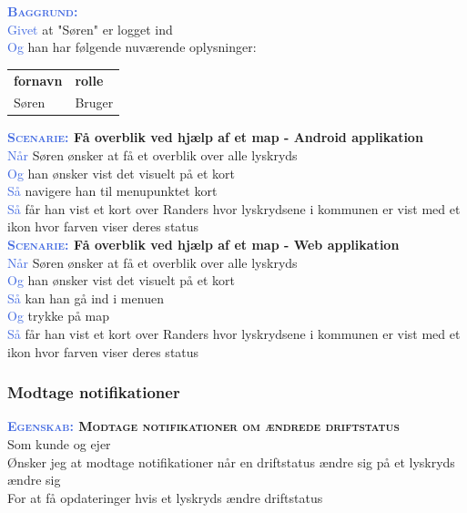 \textsc{\textcolor{RoyalBlue}{\textbf{Baggrund:}}}\\
\textcolor{RoyalBlue}{Givet} at "Søren" er logget ind\\
\textcolor{RoyalBlue}{Og} han har følgende nuværende oplysninger:\\
\begin{tabular}{| l | l |}
	\textbf{fornavn} & \textbf{rolle} \\
	Søren & Bruger\\
\end{tabular}
\newline \newline
\clearpage

\textbf{\textsc{\textcolor{RoyalBlue}{Scenarie:}} Få overblik ved hjælp af et map - Android applikation}\\
\textcolor{RoyalBlue}{Når} Søren ønsker at få et overblik over alle lyskryds\\
\textcolor{RoyalBlue}{Og} han ønsker vist det visuelt på et kort\\
\textcolor{RoyalBlue}{Så} navigere han til menupunktet kort\\
\textcolor{RoyalBlue}{Så} får han vist et kort over Randers hvor lyskrydsene i kommunen er vist med et ikon hvor farven viser deres status\\

\textbf{\textsc{\textcolor{RoyalBlue}{Scenarie:}} Få overblik ved hjælp af et map - Web applikation}\\
\textcolor{RoyalBlue}{Når} Søren ønsker at få et overblik over alle lyskryds\\
\textcolor{RoyalBlue}{Og} han ønsker vist det visuelt på et kort\\
\textcolor{RoyalBlue}{Så} kan han gå ind i menuen\\
\textcolor{RoyalBlue}{Og} trykke på map\\
\textcolor{RoyalBlue}{Så} får han vist et kort over Randers hvor lyskrydsene i kommunen er vist med et ikon hvor farven viser deres status\\

\subsubsection{Modtage notifikationer}
\textbf{\textsc{\textcolor{RoyalBlue}{Egenskab:} Modtage notifikationer om ændrede driftstatus}}\\
Som kunde og ejer\\
Ønsker jeg at modtage notifikationer når en driftstatus ændre sig på et lyskryds ændre sig\\
For at få opdateringer hvis et lyskryds ændre driftstatus\\

